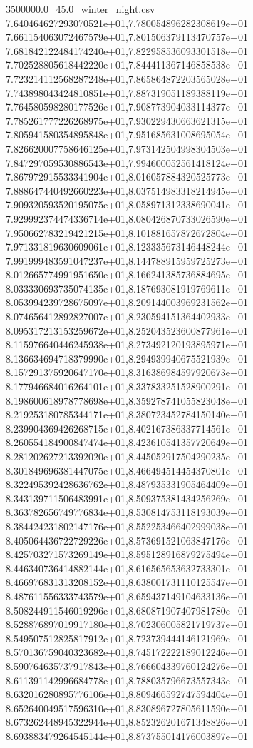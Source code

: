 \begin{filecontents*}{3500000.0_45.0_winter_night.csv}
7.640464627293070521e+01,7.780054896282308619e+01
7.661154063072467579e+01,7.801506379113470757e+01
7.681842122484174240e+01,7.822958536093301518e+01
7.702528805618442220e+01,7.844411367146858538e+01
7.723214112568287248e+01,7.865864872203565028e+01
7.743898043424810851e+01,7.887319051189388119e+01
7.764580598280177526e+01,7.908773904033114377e+01
7.785261777226268975e+01,7.930229430663621315e+01
7.805941580354895848e+01,7.951685631008695054e+01
7.826620007758646125e+01,7.973142504998304503e+01
7.847297059530886543e+01,7.994600052561418124e+01
7.867972915533341904e+01,8.016057884320525773e+01
7.888647440492660223e+01,8.037514983318214945e+01
7.909320593520195075e+01,8.058971312338690041e+01
7.929992374474336714e+01,8.080426870733026590e+01
7.950662783219421215e+01,8.101881657872672804e+01
7.971331819630609061e+01,8.123335673146448244e+01
7.991999483591047237e+01,8.144788915959725273e+01
8.012665774991951650e+01,8.166241385736884695e+01
8.033330693735074135e+01,8.187693081919769611e+01
8.053994239728675097e+01,8.209144003969231562e+01
8.074656412892827007e+01,8.230594151364402933e+01
8.095317213153259672e+01,8.252043523600877961e+01
8.115976640446245938e+01,8.273492120193895971e+01
8.136634694718379990e+01,8.294939940675521939e+01
8.157291375920647170e+01,8.316386984597920673e+01
8.177946684016264101e+01,8.337833251528900291e+01
8.198600618978778698e+01,8.359278741055823048e+01
8.219253180785344171e+01,8.380723452784150140e+01
8.239904369426268715e+01,8.402167386337714561e+01
8.260554184900847474e+01,8.423610541357720649e+01
8.281202627213392020e+01,8.445052917504290235e+01
8.301849696381447075e+01,8.466494514454370801e+01
8.322495392428636762e+01,8.487935331905464409e+01
8.343139711506483991e+01,8.509375381434256269e+01
8.363782656749776834e+01,8.530814753118193039e+01
8.384424231802147176e+01,8.552253466402999038e+01
8.405064436722729226e+01,8.573691521063847176e+01
8.425703271573269149e+01,8.595128916879275494e+01
8.446340736414882144e+01,8.616565653632733301e+01
8.466976831313208152e+01,8.638001731110125547e+01
8.487611556333743579e+01,8.659437149104633136e+01
8.508244911546019296e+01,8.680871907407981780e+01
8.528876897019917180e+01,8.702306005821719737e+01
8.549507512825817912e+01,8.723739444146121969e+01
8.570136759040323682e+01,8.745172222189012246e+01
8.590764635737917843e+01,8.766604339760124276e+01
8.611391142996684778e+01,8.788035796673557343e+01
8.632016280895776106e+01,8.809466592747594404e+01
8.652640049517596310e+01,8.830896727805611590e+01
8.673262448945322944e+01,8.852326201671348826e+01
8.693883479264545144e+01,8.873755014176003897e+01

\end{filecontents*}
